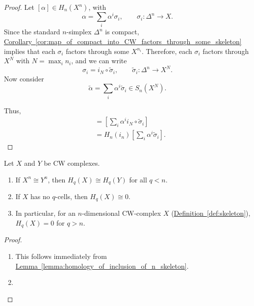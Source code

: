 \documentclass[main.tex]{subfiles}
\begin{document}
\begin{proof}
  Let $[\alpha] \in H_{n}(X^{n})$, with
  \begin{equation*}
    \alpha = \sum_{i} \alpha^{i} \sigma_{i},\qquad \sigma_{i}\colon \Delta^{n} \to X.
  \end{equation*}
  Since the standard $n$-simplex $\Delta^{n}$ is compact, \hyperref[cor:map_of_compact_into_CW_factors_through_some_skeleton]{Corollary~\ref*{cor:map_of_compact_into_CW_factors_through_some_skeleton}} implies that each $\sigma_{i}$ factors through some $X^{n_{i}}$. Therefore, each $\sigma_{i}$ factors through $X^{N}$ with $N = \max_{i} n_{i}$, and we can write
  \begin{equation*}
    \sigma_{i} = i_{N} \circ \tilde{\sigma}_{i},\qquad \tilde{\sigma}_{i}\colon \Delta^{n} \to X^{N}.
  \end{equation*}
  Now consider
  \begin{equation*}
    \tilde{\alpha} = \sum_{i} \alpha^{i} \tilde{\sigma}_{i} \in S_{n}(X^{N}).
  \end{equation*}

  Thus,
  \begin{align*}
    [\alpha] &= \left[ \sum_{i} \alpha^{i} i_{N} \circ \tilde{\sigma}_{i} \right] \\
    &= H_{n}(i_{n})\left[ \sum_{i} \alpha^{i} \tilde{\sigma}_{i} \right].
  \end{align*}
\end{proof}

\begin{corollary}
  Let $X$ and $Y$ be CW complexes.
  \begin{enumerate}
    \item If $X^{n} \cong Y^{n}$, then $H_{q}(X) \cong H_{q}(Y)$ for all $q < n$.

    \item If $X$ has no $q$-cells, then $H_{q}(X) \cong 0$.

    \item In particular, for an $n$-dimensional CW-complex $X$ (\hyperref[def:skeleton]{Definition~\ref*{def:skeleton}}), $H_{q}(X) = 0$ for $q > n$.
  \end{enumerate}
\end{corollary}
\begin{proof}
  \leavevmode
  \begin{enumerate}
    \item This follows immediately from \hyperref[lemma:homology_of_inclusion_of_n_skeleton]{Lemma~\ref*{lemma:homology_of_inclusion_of_n_skeleton}}.

    \item
  \end{enumerate}
\end{proof}
\end{document}
